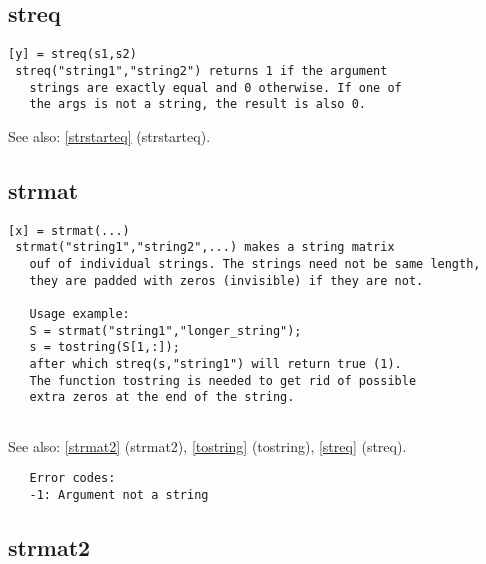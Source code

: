 \documentclass[a4paper]{article}
\begin{document}
\subsection{streq\label{streq}}

\begin{tscreen}
\begin{verbatim}
[y] = streq(s1,s2)
 streq("string1","string2") returns 1 if the argument
   strings are exactly equal and 0 otherwise. If one of
   the args is not a string, the result is also 0.
\end{verbatim}

See also: \ref{strstarteq} {(strstarteq)}.
\end{tscreen}





\subsection{strmat\label{strmat}}

\begin{tscreen}
\begin{verbatim}
[x] = strmat(...)
 strmat("string1","string2",...) makes a string matrix
   ouf of individual strings. The strings need not be same length,
   they are padded with zeros (invisible) if they are not.

   Usage example:
   S = strmat("string1","longer_string");
   s = tostring(S[1,:]);
   after which streq(s,"string1") will return true (1).
   The function tostring is needed to get rid of possible
   extra zeros at the end of the string.
   
\end{verbatim}

See also: \ref{strmat2} {(strmat2)}, \ref{tostring} {(tostring)}, \ref{streq} {(streq)}.
\begin{verbatim}
   Error codes:
   -1: Argument not a string
\end{verbatim}
\end{tscreen}





\subsection{strmat2\label{strmat2}}
\end{document}
